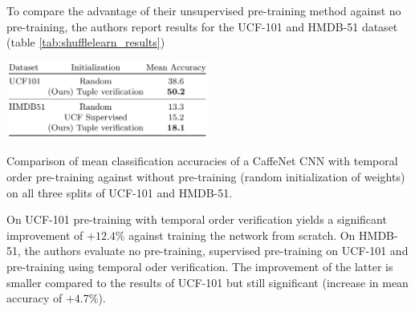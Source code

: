 To compare the advantage of their unsupervised pre-training method against no pre-training, the authors report results for the UCF-101 and HMDB-51 dataset (table \ref{tab:shufflelearn_results})

\begin{table}[H]
    \centering
    \includegraphics[width=0.5\textwidth]{img_deep/shufflelearn_results}
    \caption{Comparison of mean classification accuracies of a CaffeNet CNN with temporal order pre-training against without pre-training (random initialization of weights) on all three splits of UCF-101 and HMDB-51. \cite{misra_shuffle_2016}}
    \label{tab:shufflelearn_results}
\end{table}

On UCF-101 pre-training with temporal order verification yields a significant improvement of $+12.4\%$ against training the network from scratch.
On HMDB-51, the authors evaluate no pre-training, supervised pre-training on UCF-101 and pre-training using temporal oder verification.
The improvement of the latter is smaller compared to the results of UCF-101 but still significant (increase in mean accuracy of $+4.7\%$).
